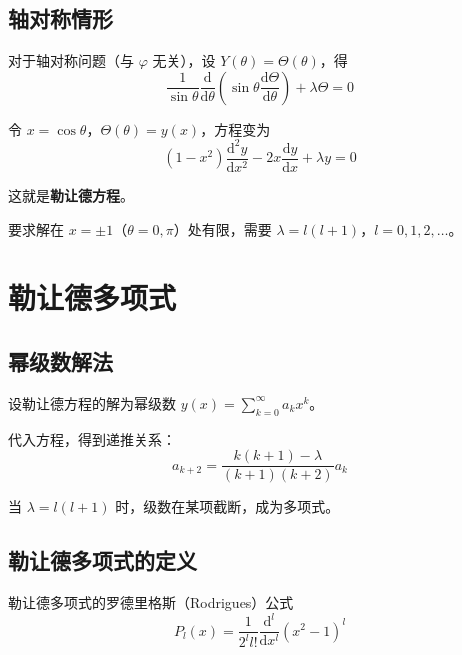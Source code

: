\subsection{轴对称情形}

对于轴对称问题（与 $\varphi$ 无关），设 $Y(\theta) = \Theta(\theta)$，得
\begin{equation}
    \frac{1}{\sin\theta}\frac{\mathrm{d}}{\mathrm{d}\theta}\left(\sin\theta\frac{\mathrm{d}\Theta}{\mathrm{d}\theta}\right) + \lambda\Theta = 0
\end{equation}

令 $x = \cos\theta$，$\Theta(\theta) = y(x)$，方程变为
\begin{equation}
    \boxed{(1-x^2)\frac{\mathrm{d}^2 y}{\mathrm{d}x^2} - 2x\frac{\mathrm{d}y}{\mathrm{d}x} + \lambda y = 0}
\end{equation}

这就是\textbf{勒让德方程}。

要求解在 $x = \pm 1$（$\theta = 0, \pi$）处有限，需要 $\lambda = l(l+1)$，$l = 0, 1, 2, \ldots$。

\section{勒让德多项式}

\subsection{幂级数解法}

设勒让德方程的解为幂级数 $y(x) = \sum_{k=0}^{\infty} a_k x^k$。

代入方程，得到递推关系：
\begin{equation}
    a_{k+2} = \frac{k(k+1) - \lambda}{(k+1)(k+2)}a_k
\end{equation}

当 $\lambda = l(l+1)$ 时，级数在某项截断，成为多项式。

\subsection{勒让德多项式的定义}

\begin{dingliyi}{勒让德多项式的罗德里格斯（Rodrigues）公式}{}
\[
    P_l(x) = \frac{1}{2^l l!}\frac{\mathrm{d}^l}{\mathrm{d}x^l}(x^2 - 1)^l
\]
\end{dingliyi}


